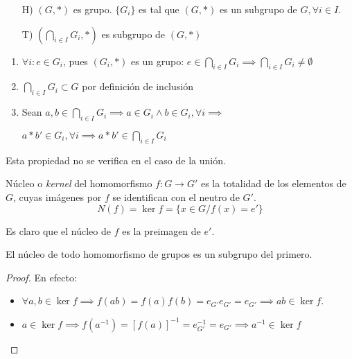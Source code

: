 	\begin{fmd-proof}
		\begin{itemize}
			\item[H)] $(G, *)$ es grupo. $\{G_i\}$ es tal que $(G, *)$ es un subgrupo de $G, \forall i \in I$.
			\item[T)] $\left( \bigcap_{i \in I} G_i, * \right)$ es subgrupo de $(G, *)$
		\end{itemize}
		\begin{enumerate}[label=\roman*)]
			\item $\forall i: e \in G_i$, pues $(G_i, *)$ es un grupo: $e \in \bigcap_{i \in I} G_i \implies \bigcap_{i \in I} G_i \ne \emptyset$
			\item $\bigcap_{i \in I} G_i \subset G$ por definición de inclusión
			\item Sean $a, b \in \bigcap_{i \in I}G_i \implies a \in G_i \land b \in G_i, \forall i \implies$
			
			$a * b'\in G_i, \forall i \implies a * b' \in \bigcap_{i \in I}G_i$
		\end{enumerate}
	\end{fmd-proof}
	Esta propiedad no se verifica en el caso de la unión.

	\begin{fmd-definition}
		Núcleo o \textit{kernel} del homomorfismo $f: G \rightarrow G'$ es la totalidad de los elementos de $G$, cuyas imágenes por $f$ se identifican con el neutro de $G'$.
		\[ N(f) = \ker f = \{ x \in G / f(x) = e' \} \]
	\end{fmd-definition}
	Es claro que el núcleo de $f$ es la preimagen de $e'$.
	
\begin{figure}[H]
	\centering
	
	\caption{}
	\label{fig:kernel}
\end{figure}

	\begin{proposition}
		El núcleo de todo homomorfismo de grupos es un subgrupo del primero.
	\end{proposition}
	\begin{proof}
		En efecto:
		\begin{itemize}
			\item $\forall a, b \in \ker f \implies f(ab) = f(a)f(b) = e_{G'} e_{G'} = e_{G'} \implies ab \in \ker f$.
			\item $a \in \ker f \implies f(a^{-1}) = \left[ f(a) \right]^{-1}=e_{G'}^{-1} = e_{G'} \implies a^{-1} \in \ker f$
		\end{itemize}
	\end{proof}
	
